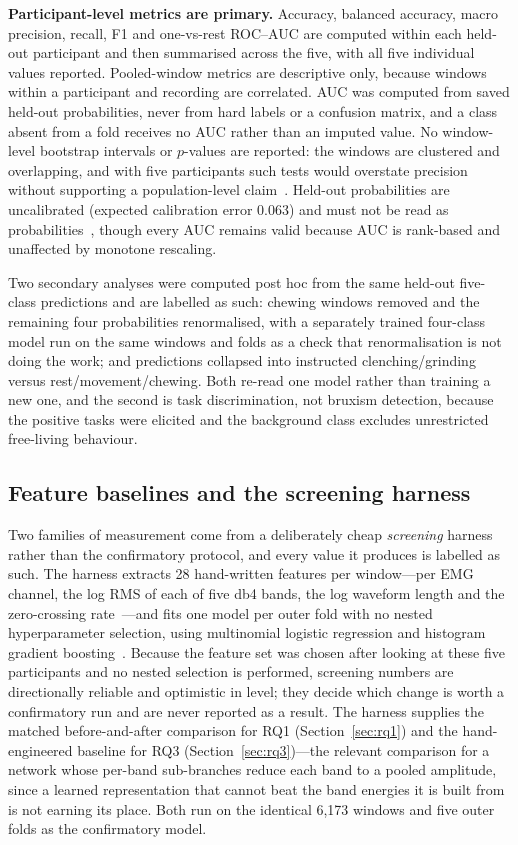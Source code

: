 \documentclass[pdflatex,sn-nature,iicol]{sn-jnl}
\begin{document}
\textbf{Participant-level metrics are primary.} Accuracy, balanced accuracy, macro precision, recall, F1 and one-vs-rest ROC--AUC are computed within each held-out participant and then summarised across the five, with all five individual values reported. Pooled-window metrics are descriptive only, because windows within a participant and recording are correlated. AUC was computed from saved held-out probabilities, never from hard labels or a confusion matrix, and a class absent from a fold receives no AUC rather than an imputed value. No window-level bootstrap intervals or $p$-values are reported: the windows are clustered and overlapping, and with five participants such tests would overstate precision without supporting a population-level claim~\cite{lehmann2006testing,demsar2006statistical}. Held-out probabilities are uncalibrated (expected calibration error 0.063) and must not be read as probabilities~\cite{guo2017calibration}, though every AUC remains valid because AUC is rank-based and unaffected by monotone rescaling.

Two secondary analyses were computed post hoc from the same held-out five-class predictions and are labelled as such: chewing windows removed and the remaining four probabilities renormalised, with a separately trained four-class model run on the same windows and folds as a check that renormalisation is not doing the work; and predictions collapsed into instructed clenching/grinding versus rest/movement/chewing. Both re-read one model rather than training a new one, and the second is task discrimination, not bruxism detection, because the positive tasks were elicited and the background class excludes unrestricted free-living behaviour.

\subsection{Feature baselines and the screening harness}
\label{sec:screening}

Two families of measurement come from a deliberately cheap \emph{screening} harness rather than the confirmatory protocol, and every value it produces is labelled as such. The harness extracts 28 hand-written features per window---per EMG channel, the log RMS of each of five db4 bands, the log waveform length and the zero-crossing rate~\cite{phinyomark2012feature}---and fits one model per outer fold with no nested hyperparameter selection, using multinomial logistic regression and histogram gradient boosting~\cite{pedregosa2011scikit}. Because the feature set was chosen after looking at these five participants and no nested selection is performed, screening numbers are directionally reliable and optimistic in level; they decide which change is worth a confirmatory run and are never reported as a result. The harness supplies the matched before-and-after comparison for RQ1 (Section~\ref{sec:rq1}) and the hand-engineered baseline for RQ3 (Section~\ref{sec:rq3})---the relevant comparison for a network whose per-band sub-branches reduce each band to a pooled amplitude, since a learned representation that cannot beat the band energies it is built from is not earning its place. Both run on the identical 6,173 windows and five outer folds as the confirmatory model.
\end{document}
